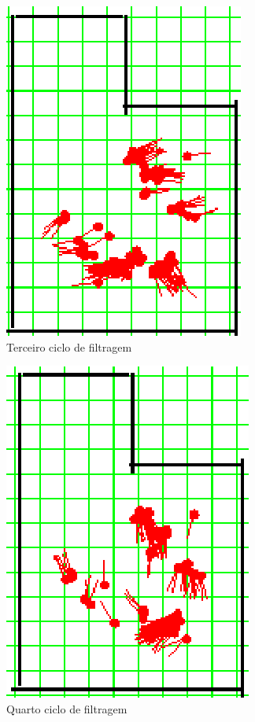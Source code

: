 \begin{figure}[H]
  \centering
  \includegraphics[scale=0.6]{figuras/cen1_ex1/4.eps}
  \caption[Terceiro Ciclo de Filtragem]{Terceiro ciclo de filtragem}
  \label{img:cen1_ex1_4}
\end{figure}

\begin{figure}[H]
  \centering
  \includegraphics[scale=0.6]{figuras/cen1_ex1/5.eps}
  \caption[Quarto Ciclo de Filtragem]{Quarto ciclo de filtragem}
  \label{img:cen1_ex1_5}
\end{figure}

